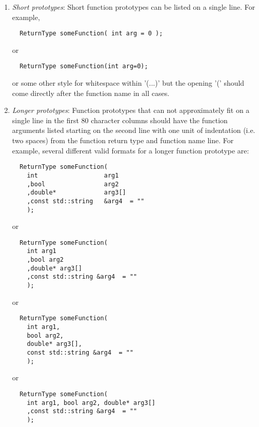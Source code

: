 \begin{enumerate}
\begin{enumerate}
  {}\item\textit{Short prototypes}: Short function prototypes can be listed
  on a single line.  For example,

  {\small\begin{verbatim}
  ReturnType someFunction( int arg = 0 );
  \end{verbatim}}

  or 

  {\small\begin{verbatim}
  ReturnType someFunction(int arg=0);
  \end{verbatim}}

  or some other style for whitespace within '(...)' but the opening '(' should
  come directly after the function name in all cases.

  {}\item\textit{Longer prototypes}: Function prototypes that can not
  approximately fit on a single line in the first 80 character columns should
  have the function arguments listed starting on the second line with one unit
  of indentation (i.e. two spaces) from the function return type and function
  name line.  For example, several different valid formats for a longer
  function prototype are:

  {\small\begin{verbatim}
  ReturnType someFunction(
    int                  arg1
    ,bool                arg2
    ,double*             arg3[]
    ,const std::string   &arg4  = ""
    );
  \end{verbatim}}
  
  or
  
  {\small\begin{verbatim}
  ReturnType someFunction(
    int arg1
    ,bool arg2
    ,double* arg3[]
    ,const std::string &arg4  = ""
    );
  \end{verbatim}}
  
  or
  
  {\small\begin{verbatim}
  ReturnType someFunction(
    int arg1,
    bool arg2,
    double* arg3[],
    const std::string &arg4  = ""
    );
  \end{verbatim}}
  
  or
  
  {\small\begin{verbatim}
  ReturnType someFunction(
    int arg1, bool arg2, double* arg3[]
    ,const std::string &arg4  = ""
    );
  \end{verbatim}}
  

\end{enumerate}
\end{enumerate}
